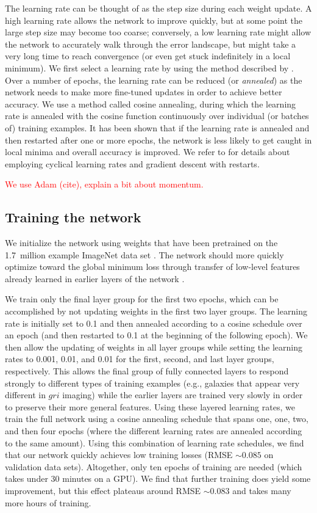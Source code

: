 \documentclass[fleqn,usenatbib]{mnras}
\newcommand{\editorial}[1]{\textcolor{red}{#1}}
\begin{document}
The learning rate can be thought of as the step size during each weight update.
A high learning rate allows the network to improve quickly, but at some point the large step size may become too coarse; conversely, a low learning rate might allow the network to accurately walk through the error landscape, but might take a very long time to reach convergence (or even get stuck indefinitely in a local minimum).
We first select a learning rate by using the method described by \cite{CLR}.
Over a number of epochs, the learning rate can be reduced (or \textit{annealed}) as the network needs to make more fine-tuned updates in order to achieve better accuracy. 
We use a method called cosine annealing, during which the learning rate is annealed with the cosine function continuously over individual (or batches of) training examples.
It has been shown that if the learning rate is annealed and then restarted after one or more epochs, the network is less likely to get caught in local minima and overall accuracy is improved. 
We refer to \cite{SGDR} for details about employing cyclical learning rates and gradient descent with restarts.

\editorial{We use Adam (cite), explain a bit about momentum.}


\subsection{Training the network}
We initialize the network using weights that have been pretrained on the 1.7~million example ImageNet data set \citep[which contains 1000 classes of objects;][]{ImageNet}.
The network should more quickly optimize toward the global minimum loss through transfer of low-level features already learned in earlier layers of the network \citep[known as transfer learning; see, e.g.,][]{Pan2010}.

We train only the final layer group for the first two epochs, which can be accomplished by not updating weights in the first two layer groups.
The learning rate is initially set to 0.1 and then annealed according to a cosine schedule over an epoch (and then restarted to 0.1 at the beginning of the following epoch).
We then allow the updating of weights in all layer groups while setting the learning rates to 0.001, 0.01, and 0.01 for the first, second, and last layer groups, respectively.
This allows the final group of fully connected layers to respond strongly to different types of training examples (e.g., galaxies that appear very different in $gri$ imaging) while the earlier layers are trained very slowly in order to preserve their more general features.
Using these layered learning rates, we train the full network using a cosine annealing schedule that spans one, one, two, and then four epochs (where the different learning rates are annealed according to the same amount).
Using this combination of learning rate schedules, we find that our network quickly achieves low training losses (RMSE $\sim 0.085$ on validation data sets).
Altogether, only ten epochs of training are needed (which takes under 30 minutes on a GPU).
We find that further training does yield some improvement, but this effect plateaus around RMSE $\sim 0.083$ and takes many more hours of training.
\end{document}
